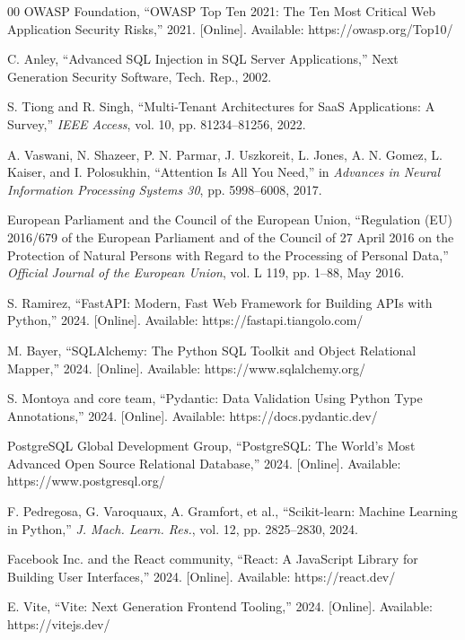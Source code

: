 \documentclass[conference]{IEEEtran}
\begin{document}
\begin{thebibliography}{00}
 OWASP Foundation, ``OWASP Top Ten 2021: The Ten Most Critical Web Application Security Risks,'' 2021. [Online]. Available: https://owasp.org/Top10/

 C. Anley, ``Advanced SQL Injection in SQL Server Applications,'' Next Generation Security Software, Tech. Rep., 2002.

 S. Tiong and R. Singh, ``Multi-Tenant Architectures for SaaS Applications: A Survey,'' \textit{IEEE Access}, vol. 10, pp. 81234--81256, 2022.

 A. Vaswani, N. Shazeer, P. N. Parmar, J. Uszkoreit, L. Jones, A. N. Gomez, L. Kaiser, and I. Polosukhin, ``Attention Is All You Need,'' in \textit{Advances in Neural Information Processing Systems 30}, pp. 5998--6008, 2017.

 European Parliament and the Council of the European Union, ``Regulation (EU) 2016/679 of the European Parliament and of the Council of 27 April 2016 on the Protection of Natural Persons with Regard to the Processing of Personal Data,'' \textit{Official Journal of the European Union}, vol. L 119, pp. 1--88, May 2016.

 S. Ramirez, ``FastAPI: Modern, Fast Web Framework for Building APIs with Python,'' 2024. [Online]. Available: https://fastapi.tiangolo.com/

 M. Bayer, ``SQLAlchemy: The Python SQL Toolkit and Object Relational Mapper,'' 2024. [Online]. Available: https://www.sqlalchemy.org/

 S. Montoya and core team, ``Pydantic: Data Validation Using Python Type Annotations,'' 2024. [Online]. Available: https://docs.pydantic.dev/

 PostgreSQL Global Development Group, ``PostgreSQL: The World's Most Advanced Open Source Relational Database,'' 2024. [Online]. Available: https://www.postgresql.org/

 F. Pedregosa, G. Varoquaux, A. Gramfort, et al., ``Scikit-learn: Machine Learning in Python,'' \textit{J. Mach. Learn. Res.}, vol. 12, pp. 2825--2830, 2024.

 Facebook Inc. and the React community, ``React: A JavaScript Library for Building User Interfaces,'' 2024. [Online]. Available: https://react.dev/

 E. Vite, ``Vite: Next Generation Frontend Tooling,'' 2024. [Online]. Available: https://vitejs.dev/


\end{thebibliography}
\end{document}
